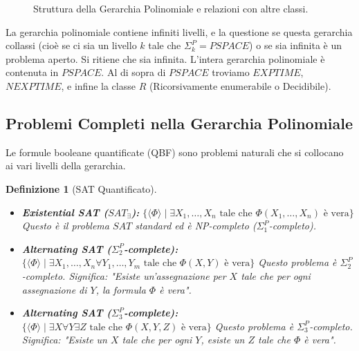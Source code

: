 \documentclass[a4paper]{article}
\newtheorem{definition}{Definizione}
\begin{document}
\begin{figure}[h]
    \caption{Struttura della Gerarchia Polinomiale e relazioni con altre classi.}
    \label{fig:polynomial_hierarchy}
\end{figure}

La gerarchia polinomiale contiene infiniti livelli, e la questione se questa gerarchia collassi (cioè se ci sia un livello $k$ tale che $\Sigma_k^P = PSPACE$) o se sia infinita è un problema aperto. Si ritiene che sia infinita. L'intera gerarchia polinomiale è contenuta in $PSPACE$. Al di sopra di $PSPACE$ troviamo $EXPTIME$, $NEXPTIME$, e infine la classe $R$ (Ricorsivamente enumerabile o Decidibile).

\subsection{Problemi Completi nella Gerarchia Polinomiale}
Le formule booleane quantificate (QBF) sono problemi naturali che si collocano ai vari livelli della gerarchia.

\begin{definition}[SAT Quantificato]
\begin{itemize}
    \item \textbf{Existential SAT ($SAT_{\exists}$):}
    $\{ \langle \Phi \rangle \mid \exists X_1, \dots, X_n \text{ tale che } \Phi(X_1, \dots, X_n) \text{ è vera} \}$
    Questo è il problema $SAT$ standard ed è NP-completo ($\Sigma_1^P$-completo).
    \item \textbf{Alternating SAT ($\Sigma_2^P$-complete):}
    $\{ \langle \Phi \rangle \mid \exists X_1, \dots, X_n \forall Y_1, \dots, Y_m \text{ tale che } \Phi(X, Y) \text{ è vera} \}$
    Questo problema è $\Sigma_2^P$-completo. Significa: "Esiste un'assegnazione per $X$ tale che per ogni assegnazione di $Y$, la formula $\Phi$ è vera".
    \item \textbf{Alternating SAT ($\Sigma_3^P$-complete):}
    $\{ \langle \Phi \rangle \mid \exists X \forall Y \exists Z \text{ tale che } \Phi(X, Y, Z) \text{ è vera} \}$
    Questo problema è $\Sigma_3^P$-completo. Significa: "Esiste un $X$ tale che per ogni $Y$, esiste un $Z$ tale che $\Phi$ è vera".
\end{itemize}
\end{definition}
\end{document}

